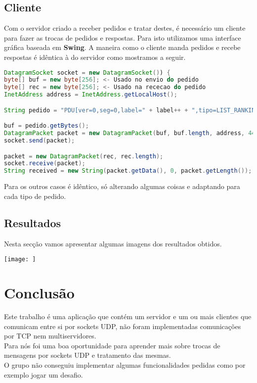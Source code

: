 \documentclass{report}
\begin{document}
\section{Cliente}\label{cliente}
Com o servidor criado a receber pedidos e tratar destes, é necessário um cliente para fazer as trocas de pedidos e respostas. Para isto utilizamos uma interface gráfica baseada em \textbf{Swing}. A maneira como o cliente manda pedidos e recebe respostas é idêntica à do servidor como mostramos a seguir.
\begin{lstlisting}[language=Java]
DatagramSocket socket = new DatagramSocket()) {
byte[] buf = new byte[256]; <- Usado no envio do pedido
byte[] rec = new byte[256]; <- Usado na rececao do pedido
InetAddress address = InetAddress.getLocalHost();

String pedido = "PDU[ver=0,seg=0,label=" + label++ + ",tipo=LIST_RANKING]Lista de campos[]"; 

buf = pedido.getBytes();
DatagramPacket packet = new DatagramPacket(buf, buf.length, address, 4445);
socket.send(packet);

packet = new DatagramPacket(rec, rec.length);
socket.receive(packet);
String received = new String(packet.getData(), 0, packet.getLength());
\end{lstlisting}
Para os outros casos é idêntico, só alterando algumas coisas e adaptando para cada tipo de pedido.

\section{Resultados}\label{resultados}
Nesta secção vamos apresentar algumas imagens dos resultados obtidos.
\begin{center}
\texttt{[image: ]}
\label{fig1}
\end{center}

\chapter{Conclusão} \label{concl}
Este trabalho é uma aplicação que contém um servidor e um ou mais clientes que comunicam entre si por sockets UDP, não foram implementadas comunicações por TCP nem multiservidores.
\\Para nós foi uma boa oportunidade para aprender mais sobre trocas de mensagens por sockets UDP e tratamento das mesmas.
\\O grupo não conseguiu implementar algumas funcionalidades pedidas como por exemplo jogar um desafio.
\end{document}

